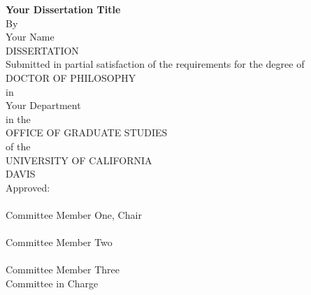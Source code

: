 

\begin{center}
   \null\vfill
   \textbf{%
      Your Dissertation Title
   }%
   \\
   \vspace{12pt}
   By \\
   \vspace{12pt}
   Your Name \\
   \smallskip
   DISSERTATION \\
   \vspace{18pt}
   Submitted in partial satisfaction of the requirements for the
   degree of \\
   \vspace{16pt}
   DOCTOR OF PHILOSOPHY \\
   \vspace{12pt}
   in \\
   \vspace{12pt}
   Your Department \\
   \vspace{12pt}
   in the \\
   \vspace{12pt}
   OFFICE OF GRADUATE STUDIES \\
   \vspace{12pt}
   of the \\
   \vspace{12pt}
   UNIVERSITY OF CALIFORNIA \\
   \vspace{8pt}
   DAVIS \\
   \vspace{18pt}
   Approved: \\
   \vspace{24pt}
   \makebox[3in]{\hrulefill} \\
   Committee Member One, Chair \\
   \vspace{12pt}
   \vspace{12pt}
   \makebox[3in]{\hrulefill} \\
   Committee Member Two \\
   \vspace{12pt}
   \vspace{12pt}
   \makebox[3in]{\hrulefill} \\
   Committee Member Three \\
   \vspace{18pt}
   Committee in Charge \\
   \vspace{12pt}
   \the\year \\
   \vfill
\end{center}
